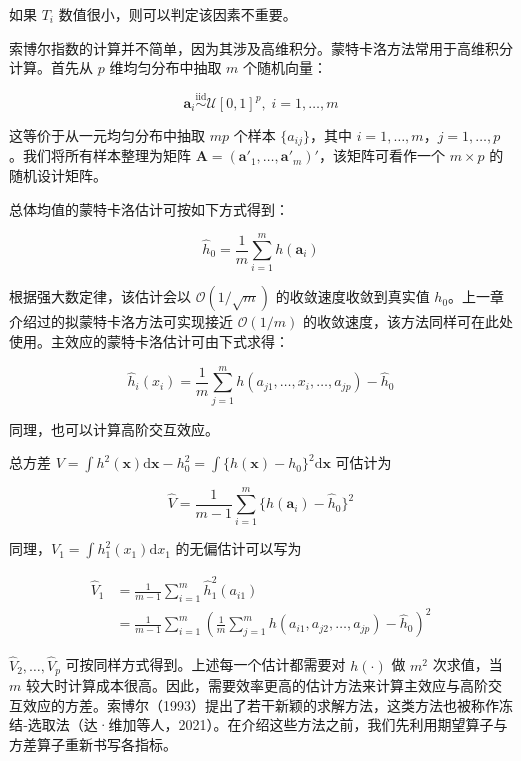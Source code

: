 \documentclass{ctexart}
\begin{document}
如果 $T_i$ 数值很小，则可以判定该因素不重要。

索博尔指数的计算并不简单，因为其涉及高维积分。蒙特卡洛方法常用于高维积分计算。首先从 $p$ 维均匀分布中抽取 $m$ 个随机向量：

\begin{equation*}
\boldsymbol{a}_i\stackrel{\text{iid}}{\sim}\mathcal{U}[0,1]^p,\;i=1,\dots,m
\end{equation*}

这等价于从一元均匀分布中抽取 $mp$ 个样本 $\{a_{ij}\}$，其中 $i=1,\dots,m$，$j=1,\dots,p$。我们将所有样本整理为矩阵 $\boldsymbol{A}=(\boldsymbol{a}'_1,\dots,\boldsymbol{a}'_m)'$，该矩阵可看作一个 $m\times p$ 的随机设计矩阵。

总体均值的蒙特卡洛估计可按如下方式得到：

\begin{equation*}
\widehat{h}_0=\frac{1}{m}\sum_{i=1}^{m}h(\boldsymbol{a}_i)
\end{equation*}

根据强大数定律，该估计会以 $\mathcal{O}(1/\sqrt{m})$ 的收敛速度收敛到真实值 $h_0$。上一章介绍过的拟蒙特卡洛方法可实现接近 $\mathcal{O}(1/m)$ 的收敛速度，该方法同样可在此处使用。主效应的蒙特卡洛估计可由下式求得：

\begin{equation*}
\widehat{h}_i(x_i)=\frac{1}{m}\sum_{j=1}^{m}h(a_{j1},\dots,x_i,\dots,a_{jp})-\widehat{h}_0
\end{equation*}

同理，也可以计算高阶交互效应。

总方差 $V=\int h^2(\boldsymbol{x})\mathrm{d}\boldsymbol{x} - h_0^2=\int\{h(\boldsymbol{x})-h_0\}^2\mathrm{d}\boldsymbol{x}$ 可估计为

\begin{equation*}
\widehat V=\frac{1}{m-1}\sum_{i=1}^{m}\{h(\boldsymbol{a}_i)-\widehat h_0\}^2
\tag{6.5}
\end{equation*}

同理，$V_1=\int h_1^2(x_1)\mathrm{d}x_1$ 的无偏估计可以写为

\begin{align*}
\widehat V_1&=\frac{1}{m-1}\sum_{i=1}^{m}\widehat h_1^2(a_{i1})\\
&=\frac{1}{m-1}\sum_{i=1}^{m}\left(\frac{1}{m}\sum_{j=1}^{m}h(a_{i1},a_{j2},\dots,a_{jp})-\widehat h_0\right)^2
\end{align*}

$\widehat V_2,\dots,\widehat V_p$ 可按同样方式得到。上述每一个估计都需要对 $h(\cdot)$ 做 $m^2$ 次求值，当 $m$ 较大时计算成本很高。因此，需要效率更高的估计方法来计算主效应与高阶交互效应的方差。索博尔（1993）提出了若干新颖的求解方法，这类方法也被称作冻结‑选取法（达·维加等人，2021）。在介绍这些方法之前，我们先利用期望算子与方差算子重新书写各指标。
\end{document}
